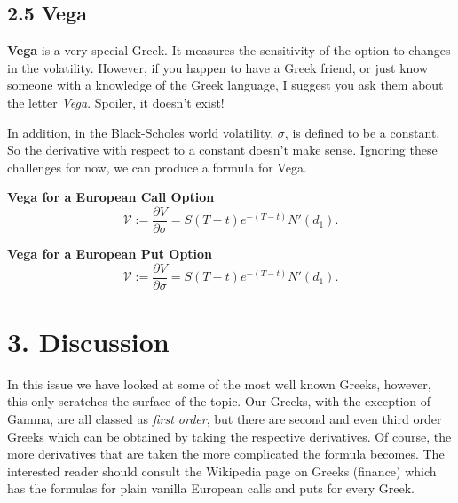 \documentclass[11pt]{article}
\begin{document}
\subsection*{2.5 Vega}
\textbf{Vega} is a very special Greek. It measures the sensitivity of the option to changes in the volatility. However, if you happen to have a Greek friend, or just know someone with a knowledge of the Greek language, I suggest you ask them about the letter \textit{Vega}. Spoiler, it doesn't exist! 

In addition, in the Black-Scholes world volatility, $\sigma$, is defined to be a constant. So the derivative with respect to a constant doesn't make sense. Ignoring these challenges for now, we can produce a formula for Vega.

\textbf{Vega for a European Call Option}
\begin{equation}
    \mathcal{V} := \frac{\partial V}{\partial \sigma} = S(T-t) e^{-(T-t)} N'(d_1).
\end{equation}

\textbf{Vega for a European Put Option}
\begin{equation}
    \mathcal{V} := \frac{\partial V}{\partial \sigma} = S(T-t) e^{-(T-t)} N'(d_1).
\end{equation}

\section*{3. Discussion}
In this issue we have looked at some of the most well known Greeks, however, this only scratches the surface of the topic. Our Greeks, with the exception of Gamma, are all classed as \textit{first order}, but there are second and even third order Greeks which can be obtained by taking the respective derivatives. Of course, the more derivatives that are taken the more complicated the formula becomes. The interested reader should consult the Wikipedia page on Greeks (finance) which has the formulas for plain vanilla European calls and puts for every Greek. 
\end{document}
